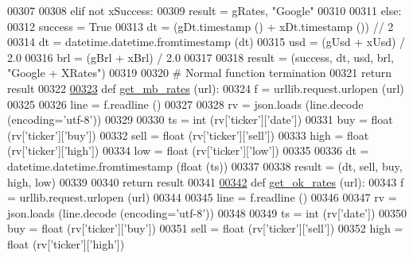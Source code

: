 \begin{DoxyCode}
{{{00307         
00308     \textcolor{keywordflow}{elif} \textcolor{keywordflow}{not} xSuccess:
00309         result = gRates, \textcolor{stringliteral}{"Google"}
00310         
00311     \textcolor{keywordflow}{else}: 
00312         success = \textcolor{keyword}{True}
00313         dt  = (gDt.timestamp () + xDt.timestamp ()) // 2
00314         dt = datetime.datetime.fromtimestamp (dt)
00315         usd = (gUsd + xUsd) / 2.0
00316         brl = (gBrl + xBrl) / 2.0
00317         
00318         result = (success, dt, usd, brl, \textcolor{stringliteral}{"Google + XRates"})
00319         
00320     \textcolor{comment}{# Normal function termination}
00321     \textcolor{keywordflow}{return} result        
00322 
\hypertarget{exch2exch_8py_source.tex_l00323}{}\hyperlink{namespaceexch2exch_a4226f3cef9fff15993d8b230a5cb92e4}{00323} \textcolor{keyword}{def }\hyperlink{namespaceexch2exch_a4226f3cef9fff15993d8b230a5cb92e4}{get\_mb\_rates} (url):
00324     f = urllib.request.urlopen (url)
00325     
00326     line = f.readline ()
00327     
00328     rv = json.loads (line.decode (encoding=\textcolor{stringliteral}{'utf-8'}))
00329     
00330     ts   = int   (rv[\textcolor{stringliteral}{'ticker'}][\textcolor{stringliteral}{'date'}])
00331     buy  = float (rv[\textcolor{stringliteral}{'ticker'}][\textcolor{stringliteral}{'buy'}])
00332     sell = float (rv[\textcolor{stringliteral}{'ticker'}][\textcolor{stringliteral}{'sell'}])
00333     high = float (rv[\textcolor{stringliteral}{'ticker'}][\textcolor{stringliteral}{'high'}])
00334     low  = float (rv[\textcolor{stringliteral}{'ticker'}][\textcolor{stringliteral}{'low'}])
00335     
00336     dt = datetime.datetime.fromtimestamp (float (ts))
00337     
00338     result = (dt, sell, buy, high, low)
00339     
00340     \textcolor{keywordflow}{return} result
00341 
\hypertarget{exch2exch_8py_source.tex_l00342}{}\hyperlink{namespaceexch2exch_a157dc1519ab4a24783fab8bf7db9c17e}{00342} \textcolor{keyword}{def }\hyperlink{namespaceexch2exch_a157dc1519ab4a24783fab8bf7db9c17e}{get\_ok\_rates} (url):
00343     f = urllib.request.urlopen (url)
00344     
00345     line = f.readline ()
00346     
00347     rv = json.loads (line.decode (encoding=\textcolor{stringliteral}{'utf-8'}))
00348     
00349     ts   = int   (rv[\textcolor{stringliteral}{'date'}])
00350     buy  = float (rv[\textcolor{stringliteral}{'ticker'}][\textcolor{stringliteral}{'buy'}])
00351     sell = float (rv[\textcolor{stringliteral}{'ticker'}][\textcolor{stringliteral}{'sell'}])
00352     high = float (rv[\textcolor{stringliteral}{'ticker'}][\textcolor{stringliteral}{'high'}])
}}}
\end{DoxyCode}

